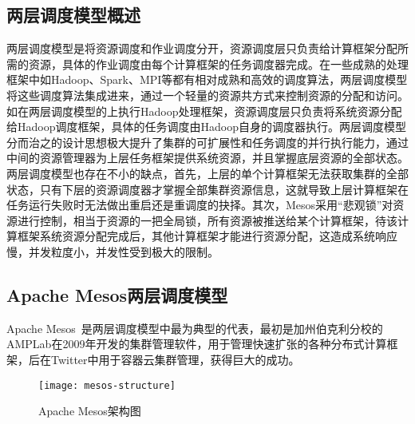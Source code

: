 \subsection{两层调度模型概述}
两层调度模型是将资源调度和作业调度分开，资源调度层只负责给计算框架分配所需的资源，具体的作业调度由每个计算框架的任务调度器完成。在一些成熟的处理框架中如Hadoop、Spark、MPI等都有相对成熟和高效的调度算法，两层调度模型将这些调度算法集成进来，通过一个轻量的资源共方式来控制资源的分配和访问。如在两层调度模型的上执行Hadoop处理框架，资源调度层只负责将系统资源分配给Hadoop调度框架，具体的任务调度由Hadoop自身的调度器执行。两层调度模型分而治之的设计思想极大提升了集群的可扩展性和任务调度的并行执行能力，通过中间的资源管理器为上层任务框架提供系统资源，并且掌握底层资源的全部状态。两层调度模型也存在不小的缺点，首先，上层的单个计算框架无法获取集群的全部状态，只有下层的资源调度器才掌握全部集群资源信息，这就导致上层计算框架在任务运行失败时无法做出重启还是重调度的抉择。其次，Mesos采用“悲观锁”对资源进行控制，相当于资源的一把全局锁，所有资源被推送给某个计算框架，待该计算框架系统资源分配完成后，其他计算框架才能进行资源分配，这造成系统响应慢，并发粒度小，并发性受到极大的限制。

\subsection{Apache Mesos两层调度模型}
Apache Mesos~\cite{Mesos2011}是两层调度模型中最为典型的代表，最初是加州伯克利分校的AMPLab在2009年开发的集群管理软件，用于管理快速扩张的各种分布式计算框架，后在Twitter中用于容器云集群管理，获得巨大的成功。

\begin{figure}[H] %
	\centering
	\texttt{[image: mesos-structure]}
	\caption{Apache Mesos架构图}
\end{figure}

